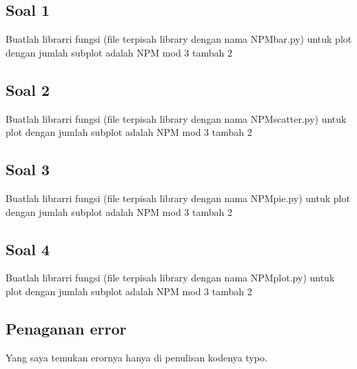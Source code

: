 \subsection{Soal 1}
Buatlah librarri fungsi (file terpisah library dengan nama NPMbar.py) untuk plot dengan jumlah subplot adalah NPM mod 3 tambah 2



\subsection{Soal 2}
Buatlah librarri fungsi (file terpisah library dengan nama NPMscatter.py) untuk plot dengan jumlah subplot adalah NPM mod 3 tambah  2



\subsection{Soal 3}
Buatlah librarri fungsi (file terpisah library dengan nama NPMpie.py) untuk plot dengan jumlah subplot adalah NPM mod 3 tambah 2



\subsection{Soal 4}
Buatlah librarri fungsi (file terpisah library dengan nama NPMplot.py) untuk plot dengan jumlah subplot adalah NPM mod 3 tambah  2



\subsection{Penaganan error}
Yang saya temukan erornya hanya di penulisan kodenya typo.


